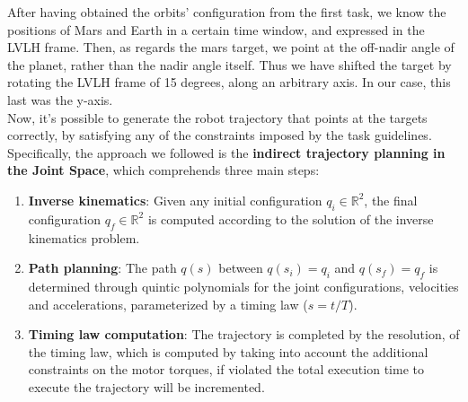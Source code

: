 \documentclass[main.tex]{subfiles}
\begin{document}
After having obtained the orbits' configuration from the first task, we know the positions of Mars and Earth in a certain time window, and expressed in the LVLH frame. Then, as regards the mars target, we point at the off-nadir angle of the planet, rather than the nadir angle itself. Thus we have shifted the target by rotating the LVLH frame of 15 degrees, along an arbitrary axis. In our case, this last was the y-axis.\\
Now, it's possible to generate the robot trajectory that points at the targets correctly, by satisfying any of the constraints imposed by the task guidelines. Specifically, the approach we followed is the \textbf{indirect trajectory planning in the Joint Space}, which comprehends three main steps:
\begin{enumerate}
    \item \textbf{Inverse kinematics}: Given any initial configuration $q_i \in \mathbb{R}^2$, the final configuration $q_f \in \mathbb{R}^2$ is computed according to the solution of the inverse kinematics problem.
    \item \textbf{Path planning}: The path $q(s)$ between $q(s_i) = q_i$ and $q(s_f) = q_f$ is determined through quintic polynomials for the joint configurations, velocities and accelerations, parameterized by a timing law ($s=t/T$).
    \item \textbf{Timing law computation}: The trajectory is completed by the resolution, of the timing law, which is computed by taking into account the additional constraints on the motor torques, if violated the total execution time to execute the trajectory will be incremented.
    
\end{enumerate}
\end{document}
